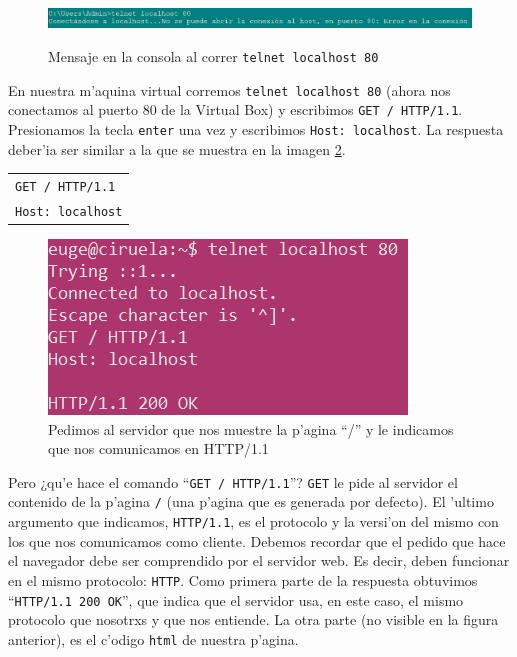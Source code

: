 \documentclass[11pt]{article}
\begin{document}
		\begin{figure}[H]
    			\centering \captionsetup{justification=centering}
    			\includegraphics[scale=0.358]{Images/Apache/fig__.png}
    			\label{fig:7}
    			\caption{Mensaje en la consola al correr \texttt{telnet localhost 80}}
		\end{figure} 

		En nuestra m'aquina virtual corremos \texttt{telnet localhost 80} (ahora nos conectamos al puerto 80 de la Virtual Box) y escribimos \texttt{GET / HTTP/1.1}. Presionamos la tecla \texttt{enter} una vez y escribimos \texttt{Host: localhost}. La respuesta deber'ia ser similar a la que se muestra en la imagen \ref{fig:4}.

		\begin{table}[H]
    			\centering
    			\begin{tabular}{|l|}
        			\hline
        			\texttt{GET / HTTP/1.1} \\
        			\texttt{Host: localhost} \\\hline
    			\end{tabular}
    			\label{tab:my_label}
		\end{table}

		\begin{figure}[H]
    			\centering \captionsetup{justification=centering}
    			\includegraphics[scale=0.6]{Images/Apache/fig4_.png}
    			\caption{Pedimos al servidor que nos muestre la p'agina ``/'' y le indicamos que nos comunicamos en HTTP/1.1}
    			\label{fig:4}
		\end{figure}

		Pero ¿qu'e hace el comando ``\texttt{GET / HTTP/1.1}''? \texttt{GET} le pide al servidor el contenido de la p'agina \texttt{/} (una p'agina que es generada por defecto). El 'ultimo argumento que indicamos, \texttt{HTTP/1.1}, es el protocolo y la versi'on del mismo con los que nos comunicamos como cliente. 
Debemos recordar que el pedido que hace el navegador debe ser comprendido por el servidor web. Es decir, deben funcionar en el mismo protocolo: \texttt{HTTP}.
Como primera parte de la respuesta obtuvimos ``\texttt{HTTP/1.1 200 OK}'', que indica que el servidor usa, en este caso, el mismo protocolo que nosotrxs y que nos entiende. La otra parte (no visible en la figura anterior), es el c'odigo \texttt{html} de nuestra p'agina.
\end{document}
